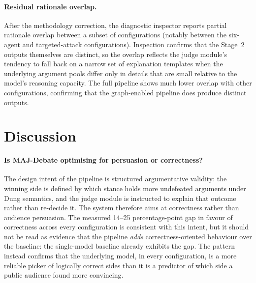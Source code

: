 \documentclass[11pt,twocolumn,letterpaper]{article}
\begin{document}
\paragraph{Residual rationale overlap.}
After the methodology correction, the diagnostic inspector
reports partial rationale overlap between a subset of
configurations (notably between the six-agent and targeted-attack
configurations). Inspection confirms that the Stage~2 outputs
themselves are distinct, so the overlap reflects the judge
module's tendency to fall back on a narrow set of explanation
templates when the underlying argument pools differ only in
details that are small relative to the model's reasoning capacity.
The full pipeline shows much lower overlap with other
configurations, confirming that the graph-enabled pipeline does
produce distinct outputs.

\section{Discussion}
\label{sec:discussion}

\paragraph{Is MAJ-Debate optimising for persuasion or correctness?}
The design intent of the pipeline is structured argumentative
validity: the winning side is defined by which stance holds more
undefeated arguments under Dung semantics, and the judge module is
instructed to explain that outcome rather than re-decide it. The
system therefore aims at correctness rather than audience
persuasion. The measured 14--25 percentage-point gap in favour of
correctness across every configuration is consistent with this
intent, but it should not be read as evidence that the pipeline
\emph{adds} correctness-oriented behaviour over the baseline: the
single-model baseline already exhibits the gap. The pattern
instead confirms that the underlying model, in every
configuration, is a more reliable picker of logically correct
sides than it is a predictor of which side a public audience found
more convincing.
\end{document}
